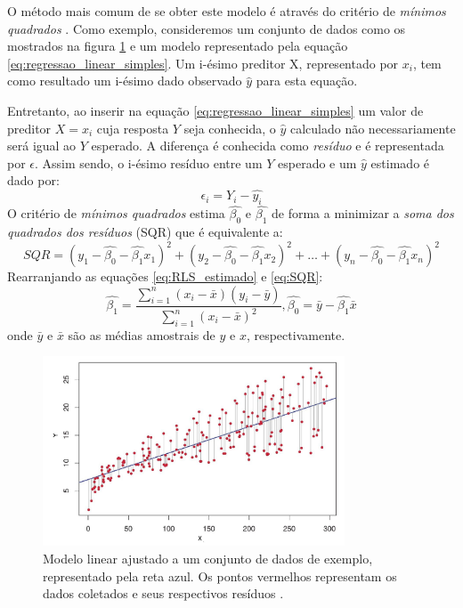 O método mais comum de se obter este modelo é através do critério de \textit{mínimos quadrados} \cite{James2013}. Como exemplo, consideremos um conjunto de dados como os mostrados na figura \ref{figure:minimos_quadrados_exemplo} e um modelo representado pela equação \ref{eq:regressao_linear_simples}. Um i-ésimo preditor X, representado por $x_i$, tem como resultado um i-ésimo dado observado $\hat{y}$ para esta equação. 

Entretanto, ao inserir na equação \ref{eq:regressao_linear_simples} um valor de preditor $X = x_i$ cuja resposta $Y$ seja conhecida, o $\hat{y}$ calculado não necessariamente será igual ao $Y$ esperado. A diferença é conhecida como \textit{resíduo} e é representada por $\epsilon$. Assim sendo, o i-ésimo resíduo entre um $Y$ esperado e um $\hat{y}$ estimado é dado por:
\begin{equation}
\label{eq:residuo}
\epsilon_i =  Y_i - \hat{y_i}
\end{equation} 
O critério de \textit{mínimos quadrados} estima $\hat{\beta_0}$ e $\hat{\beta_1}$ de forma a minimizar a \textit{soma dos quadrados dos resíduos} (SQR) que é equivalente a:
\begin{equation}
\label{eq:SQR}
SQR = (y_1-\hat{\beta_0} - \hat{\beta_1}x_1)^2 + (y_2-\hat{\beta_0} - \hat{\beta_1}x_2)^2 + \dots + (y_n-\hat{\beta_0} - \hat{\beta_1}x_n)^2
\end{equation} 
Rearranjando as equações \ref{eq:RLS_estimado} e \ref{eq:SQR}:
\begin{equation}
\label{eq:RLS_coeficientes}
\hat{\beta_1} = \frac{\sum_{i=1}^{n}(x_i-\bar{x})(y_i-\bar{y})}{\sum_{i=1}^{n}(x_i-\bar{x})^2},
\hat{\beta_0} = \bar{y} -\hat{\beta_1}\bar{x} 
\end{equation}
onde $\bar{y}$ e $\bar{x}$ são as médias amostrais de $y$ e $x$, respectivamente.
\begin{figure}
\center
\includegraphics[width=0.8\textwidth]{images/minimos_quadrados_exemplo}
\caption{Modelo linear ajustado a um conjunto de dados de exemplo, representado pela reta azul. Os pontos vermelhos representam os dados coletados e seus respectivos resíduos \cite{James2013}.} 
\label{figure:minimos_quadrados_exemplo}
\end{figure}

